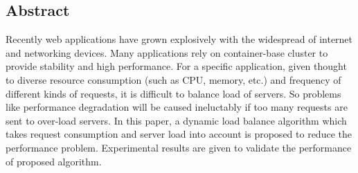 \subsection*{Abstract}
\hspace{0pt}
Recently web applications have grown explosively with the widespread of internet and networking devices. Many applications rely on container-base cluster to provide stability and high performance. For a specific application, given thought to diverse resource consumption (such as CPU, memory, etc.) and frequency of different kinds of requests, it is difficult to balance load of servers. So problems like performance degradation will be caused ineluctably if too many requests are sent to over-load servers. In this paper, a dynamic load balance algorithm which takes request consumption and server load into account is proposed to reduce the performance problem. Experimental results are given to validate the performance of proposed algorithm.
